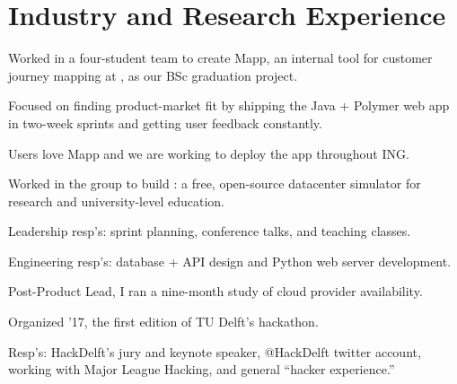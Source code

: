 \documentclass[]{deedy-resume-openfont}
\begin{document}
\hfill
\begin{minipage}[t]{0.66\textwidth} 


\section{Industry and Research Experience}

\vspace{\topsep}
\begin{tightemize}
    \item Worked in a four-student team to create Mapp, an internal tool for customer journey mapping at \href{https://www.ing.com/}{}, as our BSc graduation project.
    \item Focused on finding product-market fit by shipping the Java + Polymer web app in two-week sprints and getting user feedback constantly.
    \item Users love Mapp and we are working to deploy the app throughout ING.
\end{tightemize}
\vspace{0.5\topsep}

\begin{tightemize}
    \item Worked in the \href{https://atlarge-research.com/}{} group to build \href{https://opendc.ewi.tudelft.nl/}{}: a free, open-source datacenter simulator for research and university-level education.
    \item Leadership resp's: sprint planning, conference talks, and teaching classes.
    \item Engineering resp's: database + API design and Python web server development.
    \item Post-Product Lead, I ran a nine-month study of cloud provider availability.
\end{tightemize}
\vspace{0.5\topsep}

\begin{tightemize}
    \item Organized \href{https://hackdelft.com/}{} '17, the first edition of TU Delft's hackathon.
    \item Resp's: HackDelft’s jury and keynote speaker, @HackDelft twitter account, working with Major League Hacking, and general ``hacker experience.''
\end{tightemize}
\vspace{0.5\topsep}


\end{minipage}
\end{document}
